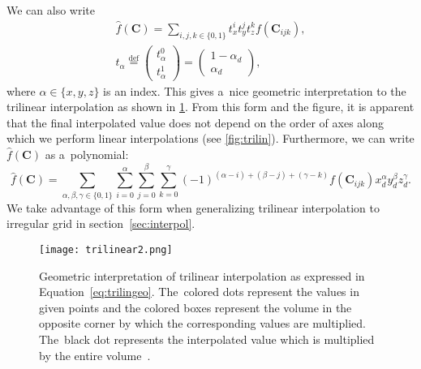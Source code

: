 				\noindent We can also write
					\begin{eqnarray}
						\label{eq:trilingeo}
						\widehat{f}(\mathbf{C}) = \sum_{i,j,k \in \{0,1\}} t_x^i t_y^j t_z^k f(\mathbf{C}_{ijk}),\\
						t_\alpha \stackrel{\text{def}}{=} \begin{pmatrix}t_\alpha^0\\ t_\alpha^1\end{pmatrix} = \begin{pmatrix}1-\alpha_d\\ \alpha_d\end{pmatrix},
					\end{eqnarray}
				where $\alpha \in \{x,y,z\}$ is an index. This gives a~nice geometric interpretation to the trilinear interpolation as shown in \cref{fig:trilin2}. From this form and the figure, it is apparent that the final interpolated value does not depend on the order of axes along which we perform linear interpolations (see \cref{fig:trilin}). Furthermore, we can write $\widehat{f}(\mathbf{C})$ as a~polynomial:
					\begin{equation}
						\label{eq:trilinpoly}
						\widehat{f}(\mathbf{C}) = \sum_{\alpha,\beta,\gamma \in \{0,1\}}\sum^{\alpha}_{i=0}\sum^{\beta}_{j=0}\sum^{\gamma}_{k=0} 	(-1)^{(\alpha-i)+(\beta-j)+(\gamma-k)} f(\mathbf{C}_{ijk}) x_d^\alpha y_d^\beta z_d^\gamma.
					\end{equation}
				We take advantage of this form when generalizing trilinear interpolation to irregular grid in section~\ref{sec:interpol}.
					
				\begin{figure}
					\centering
					\texttt{[image: trilinear2.png]}
					\caption{Geometric interpretation of trilinear interpolation as expressed in Equation~\ref{eq:trilingeo}. The~colored dots represent the values in given points and the colored boxes represent the volume in the opposite corner by which the corresponding values are multiplied. The~black dot represents the interpolated value which is multiplied by the entire volume~\cite{trilinear}.}
					\label{fig:trilin2}
				\end{figure}
				
